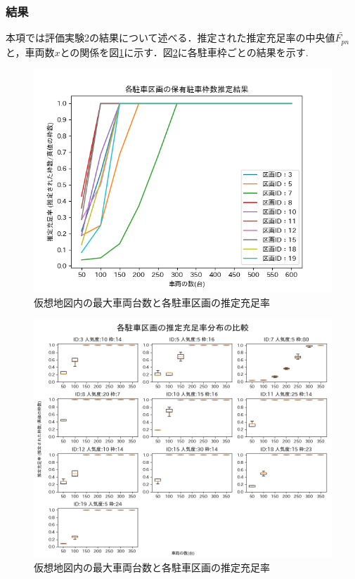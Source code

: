 \subsubsection{結果}
本項では評価実験2の結果について述べる．推定された推定充足率の中央値$\tilde{F_{pn}}$と，車両数$x$との関係を図\ref{slot-result-all-mean-fig}に示す．図\ref{slot-result-boxplots}に各駐車枠ごとの結果を示す.


\begin{figure}[htbp]
	\centering
	\includegraphics[width=14cm]{fig/slot-result-all-mean.png}
	\caption{仮想地図内の最大車両台数と各駐車区画の推定充足率}
	\label{slot-result-all-mean-fig}
\end{figure}

\begin{figure}
	\centering
	\includegraphics[width=16cm]{fig/slot-result-boxplots.png}
	\caption{仮想地図内の最大車両台数と各駐車区画の推定充足率}
	\label{slot-result-boxplots}
\end{figure}

